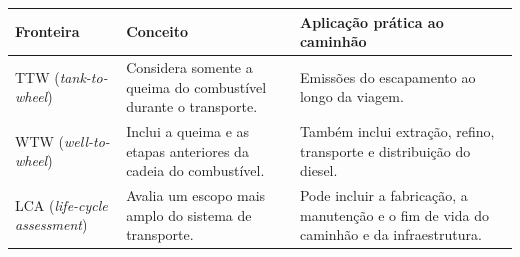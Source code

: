 \documentclass[brazil,]{article}
\begin{document}
\begin{longtable}[]{@{}lll@{}}
\toprule
\begin{minipage}[b]{0.30\columnwidth}\raggedright
Fronteira\strut
\end{minipage} & \begin{minipage}[b]{0.30\columnwidth}\raggedright
Conceito\strut
\end{minipage} & \begin{minipage}[b]{0.30\columnwidth}\raggedright
Aplicação prática ao caminhão\strut
\end{minipage}\tabularnewline
\midrule
\endhead
\begin{minipage}[t]{0.30\columnwidth}\raggedright
TTW (\emph{tank-to-wheel})\strut
\end{minipage} & \begin{minipage}[t]{0.30\columnwidth}\raggedright
Considera somente a queima do combustível durante o transporte.\strut
\end{minipage} & \begin{minipage}[t]{0.30\columnwidth}\raggedright
Emissões do escapamento ao longo da viagem.\strut
\end{minipage}\tabularnewline
\begin{minipage}[t]{0.30\columnwidth}\raggedright
WTW (\emph{well-to-wheel})\strut
\end{minipage} & \begin{minipage}[t]{0.30\columnwidth}\raggedright
Inclui a queima e as etapas anteriores da cadeia do combustível.\strut
\end{minipage} & \begin{minipage}[t]{0.30\columnwidth}\raggedright
Também inclui extração, refino, transporte e distribuição do
diesel.\strut
\end{minipage}\tabularnewline
\begin{minipage}[t]{0.30\columnwidth}\raggedright
LCA (\emph{life-cycle assessment})\strut
\end{minipage} & \begin{minipage}[t]{0.30\columnwidth}\raggedright
Avalia um escopo mais amplo do sistema de transporte.\strut
\end{minipage} & \begin{minipage}[t]{0.30\columnwidth}\raggedright
Pode incluir a fabricação, a manutenção e o fim de vida do caminhão e da
infraestrutura.\strut
\end{minipage}\tabularnewline
\bottomrule
\end{longtable}
\end{document}
